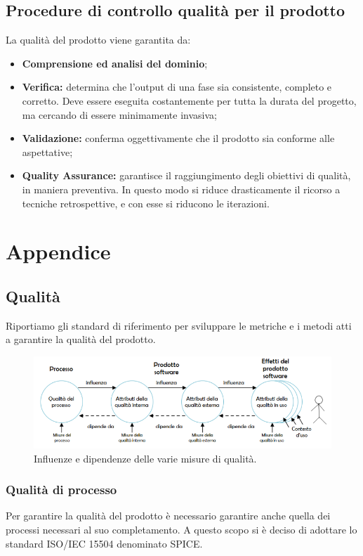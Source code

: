 \documentclass[a4paper]{article}
\begin{document}
		\subsection{Procedure di controllo qualità per il prodotto}
			La qualità del prodotto viene garantita da:
			\begin{itemize}
				\item \textbf{Comprensione ed analisi del dominio};
				\item \textbf{Verifica:} determina che l'output di una fase sia consistente, completo e corretto. 
				Deve essere eseguita costantemente per tutta la durata del progetto, ma cercando di essere minimamente invasiva;
				\item \textbf{Validazione:} conferma oggettivamente che il prodotto sia conforme alle aspettative;
				\item \textbf{Quality Assurance:} garantisce il raggiungimento degli obiettivi di qualità, in maniera preventiva. 
				In questo modo si riduce drasticamente il ricorso a tecniche retrospettive, e con esse si riducono le iterazioni.
			\end{itemize}
		
		\section{Appendice}
			\subsection{Qualità}
Riportiamo gli standard di riferimento per sviluppare le metriche e i metodi atti a garantire la qualità del prodotto.
				\begin{figure}[H]
					\centering
					\includegraphics[scale=0.65]{QualitaDelProdottoSoftware.PNG}
					\caption{Influenze e dipendenze delle varie misure di qualità.}
				\end{figure}
			\subsubsection{Qualità di processo}
				Per garantire la qualità del prodotto è necessario garantire anche quella dei processi necessari 
				al suo completamento. A questo scopo si è deciso di adottare lo standard 
				ISO/IEC 15504 denominato SPICE.
				
\end{document}
